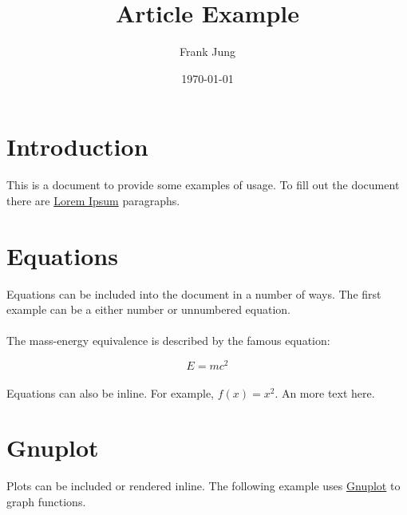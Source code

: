 \documentclass[10pt,a4paper]{article}
\title{\LaTeXe{} Article Example}
\author{Frank Jung}
\date{\today}
\begin{document}
\maketitle
\newpage

\tableofcontents{}
\listoffigures
\listoftables
\newpage

\newpage

\newcommand{\sectionbreak}{\clearpage}

\section*{Introduction}

This is a \LaTeXe{} document to provide some examples of usage. To fill out the
document there are \href{http://www.lipsum.com/}{Lorem Ipsum} paragraphs.

\lipsum[1]

\sectionbreak{}

\section*{Equations}

Equations can be included into the document in a number of ways. The first
example can be a either number or unnumbered equation.

\paragraph{}
The mass-energy equivalence is described by the famous equation:

\begin{equation}
  E = mc^2
\end{equation}

\paragraph{}
Equations can also be inline. For example, $f(x) = x^2$. An more text here.
\lipsum[2]

\sectionbreak{}

\section*{Gnuplot}

Plots can be included or rendered inline. The following example uses
\href{http://www.gnuplot.info/}{Gnuplot} to graph functions.
\end{document}
